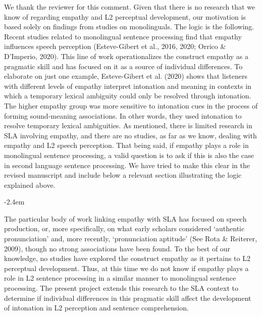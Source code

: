 \documentclass[]{article}
\renewenvironment{quote}{\begin{fquote}\advance\leftmargini -2.4em\begin{oldquote}}{\end{oldquote}\end{fquote}}
\newenvironment{fquote}
  {\def\FrameCommand{
	\fboxsep=0.6em %
	\fcolorbox{black}{white}}%
    \MakeFramed {\advance\hsize-2\width \FrameRestore}
    \begin{minipage}{\linewidth}
  }
  {\end{minipage}\endMakeFramed}
\begin{document}
We thank the reviewer for this comment.
Given that there is no research that we know of regarding empathy and L2 perceptual development, our motivation is based solely on findings from studies on monolinguals.
The logic is the following.
Recent studies related to monolingual sentence processing find that empathy influences speech perception (Esteve-Gibert et al., 2016, 2020; Orrico \& D'Imperio, 2020).
This line of work operationalizes the construct empathy as a pragmatic skill and has focused on it as a source of individual differences.
To elaborate on just one example, Esteve-Gibert et al. (2020) shows that listeners with different levels of empathy interpret intonation and meaning in contexts in which a temporary lexical ambiguity could only be resolved through intonation.
The higher empathy group was more sensitive to intonation cues in the process of forming sound-meaning associations.
In other words, they used intonation to resolve temporary lexical ambiguities.
As mentioned, there is limited research in SLA involving empathy, and there are no studies, as far as we know, dealing with empathy and L2 speech perception.
That being said, if empathy plays a role in monolingual sentence processing, a valid question is to ask if this is also the case in second language sentence processing.
We have tried to make this clear in the revised manuscript and include below a relevant section illustrating the logic explained above.

\begin{quote}
The particular body of work linking empathy with SLA has focused on speech production, or, more specifically, on what early scholars considered `authentic pronunciation' and, more recently, `pronunciation aptitude' (See Rota \& Reiterer, 2009), though no strong associations have been found.
To the best of our knowledge, no studies have explored the construct empathy as it pertains to L2 perceptual development.
Thus, at this time we do not know if empathy plays a role in L2 sentence processing in a similar manner to monolingual sentence processing.
The present project extends this research to the SLA context to determine if individual differences in this pragmatic skill affect the development of intonation in L2 perception and sentence comprehension.
\end{quote}
\end{document}
